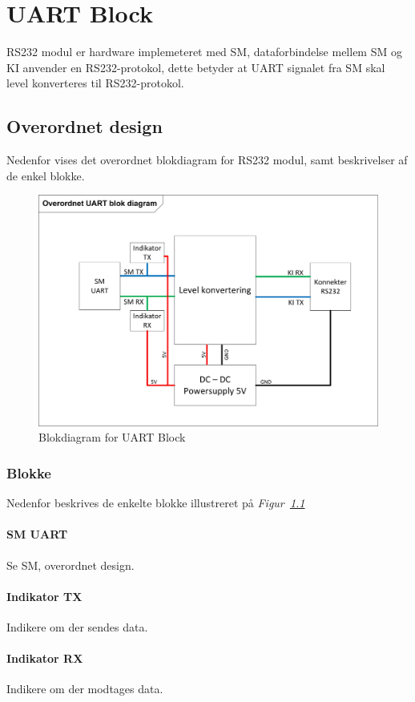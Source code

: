 \chapter{UART Block}
\label{ch:rs232}
RS232 modul er hardware implemeteret med SM,  dataforbindelse mellem SM og KI anvender en RS232-protokol, dette betyder at UART signalet fra SM skal level konverteres til RS232-protokol. 
\section{Overordnet design}
Nedenfor vises det overordnet blokdiagram for RS232 modul, samt beskrivelser af de enkel blokke.
\begin{figure}[H]
\centering
\includegraphics[scale=1]{billeder/RS232ModulBlok}
\caption{Blokdiagram for UART Block}
\label{fig:RS232ModulBlok}
\end{figure}
\newpage
\subsection{Blokke}
Nedenfor beskrives de enkelte blokke illustreret på \textit{Figur~\ref{fig:RS232ModulBlok}}
\subsubsection{SM UART}
Se SM, overordnet design.
\subsubsection{Indikator TX}
Indikere om der sendes data.
\subsubsection{Indikator RX}
Indikere om der modtages data.

